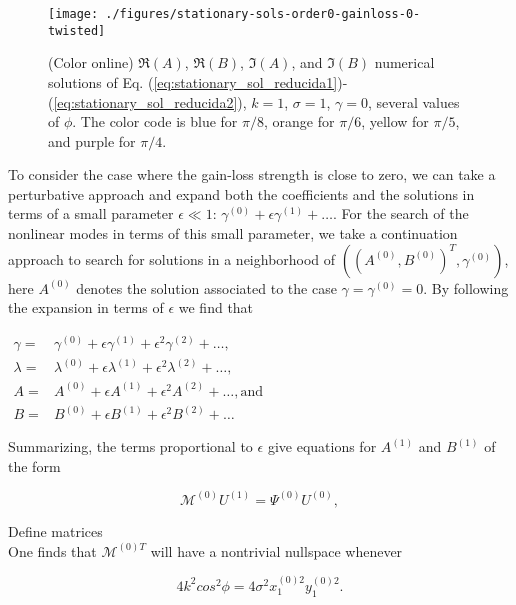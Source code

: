 \documentclass{aip-cp}
\newcommand{\MM}{{\mathcal M}}
\begin{document}
\begin{figure}[h]
  \centerline{\texttt{[image: ./figures/stationary-sols-order0-gainloss-0-twisted]}}
  \caption{(Color online) $\Re(A)$, $\Re(B)$, $\Im(A)$, and $\Im(B)$ numerical solutions of Eq. (\ref{eq:stationary_sol_reducida1})-(\ref{eq:stationary_sol_reducida2}), 
  $k=1$,  $\sigma = 1$, $\gamma =0$, several values of $\phi$. The color code is blue for $\pi/8$, orange for $\pi/6$, yellow for $\pi/5$, and purple for $\pi/4$.}
\label{fig:stationary-0}
\end{figure}

To consider the case where the gain-loss strength is close to zero, we can take a perturbative approach and expand both the coefficients and the solutions in terms of a 
small parameter   $\epsilon \ll 1$:
$\gamma^{(0)} + \epsilon \gamma^{(1)}+\dots$. For the search of the nonlinear modes in terms of this small parameter, we take a continuation approach to search for solutions in a neighborhood of $((A^{(0)},B^{(0)})^T,\gamma^{(0)})$, here $A^{(0)}$ denotes the solution 
associated to the case $\gamma = \gamma^{(0)} = 0$. By following the expansion in terms of $\epsilon$ we find that 
\begin{center}
$\begin{array}{rl}
\gamma =& \gamma^{(0)} + \epsilon \gamma^{(1)} + \epsilon^2 \gamma^{(2)}+\dots,\\
\lambda =& \lambda^{(0)} + \epsilon \lambda^{(1)} + \epsilon^2 \lambda^{(2)}+\dots,\\
A=&A^{(0)}+\epsilon A^{(1)}+\epsilon^2 A^{(2)}+\dots, \textrm{and}  \\
B=&B^{(0)}+\epsilon B^{(1)}+\epsilon^2 B^{(2)}+\dots
\end{array}$
\end{center}

Summarizing, the terms proportional to $\epsilon$ give equations for $A^{(1)}$ and $B^{(1)}$ of the form


\begin{equation}
\mathcal{M}^{(0)}U^{(1)}=\Psi^{(0)} U^{(0)}, 
\label{eq:stationary_sol_order1_matrix1}
\end{equation}

Define matrices\\


One finds that $\MM^{(0)T}$ will have a nontrivial nullspace whenever 

\begin{equation}
 4k^2cos^2\phi = 4\sigma^2x_1^{(0)2}y_1^{(0)2}.
 \label{eq:nontrivial_nullspace}
\end{equation}
\end{document}
